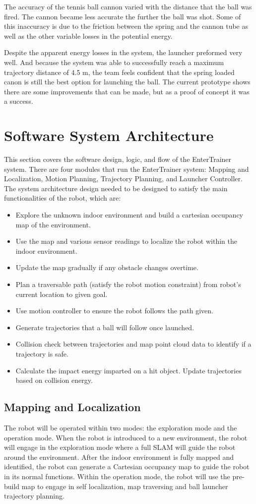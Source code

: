 \documentclass[11pt]{article}
\begin{document}
The accuracy of the tennis ball cannon varied with the distance that the ball was fired. The cannon became less accurate the further the ball was shot. Some of this inaccuracy is due to the friction between the spring and the cannon tube as well as the other variable losses in the potential energy. 

Despite the apparent energy losses in the system, the launcher preformed very well. And because the system was able to successfully reach a maximum trajectory distance of 4.5 m, the team feels confident that the spring loaded canon is still the best option for launching the ball. The current prototype shows there are some improvements that can be made, but as a proof of concept it was a success. 

\section{Software System Architecture}
This section covers the software design, logic, and flow of the EnterTrainer system. There are four modules that run the EnterTrainer system: Mapping and Localization, Motion Planning, Trajectory Planning, and Launcher Controller. The system architecture design needed to be designed to satisfy the main functionalities of the robot, which are:
\begin{itemize}
	\item Explore the unknown indoor environment and build a cartesian occupancy map of the environment. 
	\item Use the map and various sensor readings to localize the robot within the indoor environment. 
	\item Update the map gradually if any obstacle changes overtime. 
	\item Plan a traversable path (satisfy the robot motion constraint) from robot's current location to given goal.
	\item Use motion controller to ensure the robot follows the path given.
	\item Generate trajectories that a ball will follow once launched.
	\item Collision check between trajectories and map point cloud data to identify if a trajectory is safe. 
	\item Calculate the impact energy imparted on a hit object. Update trajectories based on collision energy.
\end{itemize}
\subsection{Mapping and Localization}
The robot will be operated within two modes: the exploration mode and the operation mode. When the robot is introduced to a new environment, the robot will engage in the exploration mode where a full SLAM will guide the robot around the environment. After the indoor environment is fully mapped and identified, the robot can generate a Cartesian occupancy map to guide the robot in its normal functions. Within the operation mode, the robot will use the pre-build map to engage in self localization, map traversing and ball launcher trajectory planning. 
\end{document}
